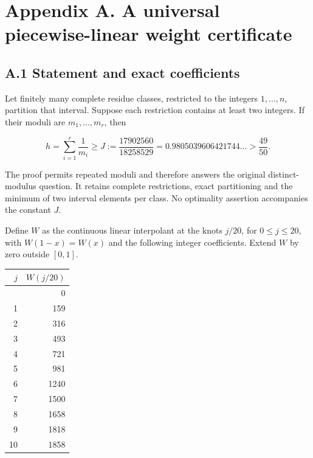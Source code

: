 \documentclass[11pt,a4paper]{article}
\begin{document}

\hypertarget{appendix-a.-a-universal-piecewise-linear-weight-certificate}{%
\section{Appendix A. A universal piecewise-linear weight
certificate}\label{appendix-a.-a-universal-piecewise-linear-weight-certificate}}


\hypertarget{a.1-statement-and-exact-coefficients}{%
\subsection{A.1 Statement and exact
coefficients}\label{a.1-statement-and-exact-coefficients}}

\begin{samepage}

Let finitely many complete residue classes, restricted to the integers
\(1,\ldots,n\), partition that interval. Suppose each restriction
contains at least two integers. If their moduli are \(m_1,\ldots,m_r\),
then

\[
\boxed{\displaystyle h=\sum_{i=1}^r\frac1{m_i}
\ge J:=\frac{17902560}{18258529}
=0.9805039606421744\ldots>\frac{49}{50}.}
\]

\end{samepage}

The proof permits repeated moduli and therefore answers the original
distinct-modulus question. It retains complete restrictions, exact
partitioning and the minimum of two interval elements per class. No
optimality assertion accompanies the constant \(J\).

Define \(W\) as the continuous linear interpolant at the knots \(j/20\),
for \(0\le j\le20\), with \(W(1-x)=W(x)\) and the following integer
coefficients. Extend \(W\) by zero outside \([0,1]\).

\begin{longtable}[]{@{}rr@{}}
\toprule\noalign{}
\(j\) & \(W(j/20)\) \\
\midrule\noalign{}
\endhead
\bottomrule\noalign{}
\endlastfoot
0 & 0 \\
1 & 159 \\
2 & 316 \\
3 & 493 \\
4 & 721 \\
5 & 981 \\
6 & 1240 \\
7 & 1500 \\
8 & 1658 \\
9 & 1818 \\
10 & 1858 \\
\end{longtable}
\end{document}
